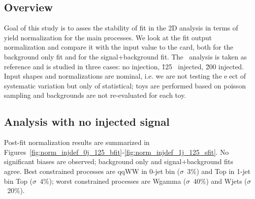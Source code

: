 \subsection{Overview}

Goal of this study is to asses the stability of fit in the 2D analysis in terms of yield normalization for the main processes.
We look at the fit output normalization and compare it with the input value to the card, both for the background only fit and for the signal+background fit.
The  \GeV\ analysis is taken as reference and is studied in three cases: no injection, \mHi\=125 \GeV\ injected, \mHi\=200 \GeV injected.
Input shapes and normalizations are nominal, i.e. we are not testing the e􏰁ect of systematic variation but only of statistical;
toys are performed based on poisson sampling and backgrounds are not re-evaluated for each toy.

\subsection{Analysis with no injected signal}

Post-fit normalization results are summarized in Figures~\ref{fig:norm_injdef_0j_125_bfit}-\ref{fig:norm_injdef_1j_125_sfit}.
No significant biases are observed; background only and signal+background fits agree.
Best constrained processes are qqWW in 0-jet bin ($\sigma$~3\%) and Top in 1-jet bin Top ($\sigma$~4\%); 
worst constrained processes are Wgamma ($\sigma$~40\%) and Wjets ($\sigma$~20\%).

